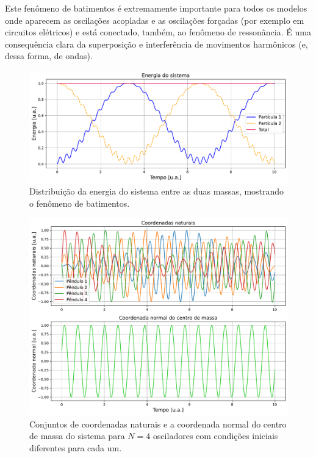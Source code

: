 \documentclass[a4paper, 11pt]{article}
\begin{document}
    Este fenômeno de batimentos é extremamente importante para todos os modelos onde aparecem as oscilações acopladas e as oscilações forçadas (por exemplo em circuitos elétricos) e está conectado, também, ao fenômeno de ressonância. É uma consequência clara da superposição e interferência de movimentos harmônicos (e, dessa forma, de ondas). 

    \begin{figure}[h!]
        \centering
        \includegraphics[width=1\linewidth]{graph_energia.pdf}
        \caption{Distribuição da energia do sistema entre as duas massas, mostrando o fenômeno de batimentos.
        \label{figura :: energia}}
    \end{figure}

    \begin{figure}[h!]
        \centering
        \includegraphics[width=1\linewidth]{graph_coordenadas_pendulos.pdf}
        \caption{Conjuntos de coordenadas naturais e a coordenada normal do centro de massa do sistema para $N=4$ osciladores com condições iniciais diferentes para cada um.
        \label{figura :: coornedas varios pendulos}}
    \end{figure}
\end{document}
